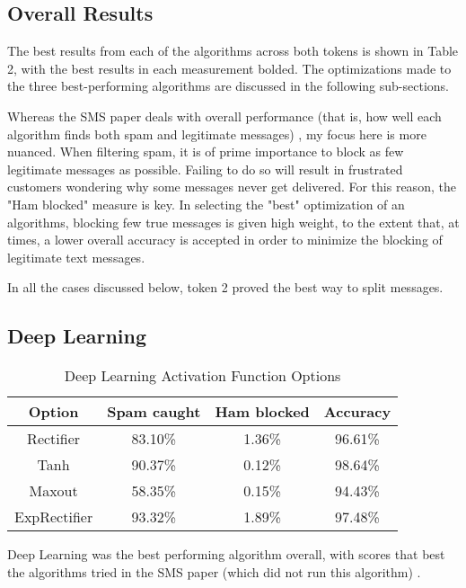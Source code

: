 \documentclass[10pt,journal,compsoc]{IEEEtran}
\begin{document}
\subsection{Overall Results}

The best results from each of the algorithms across both tokens is shown in Table 2, with the best results in each measurement bolded. The optimizations made to the three best-performing algorithms are discussed in the following sub-sections.

Whereas the SMS paper deals with overall performance (that is, how well each algorithm finds both spam and legitimate messages) \cite{Paper}, my focus here is more nuanced. When filtering spam, it is of prime importance to block as few legitimate messages as possible. Failing to do so will result in frustrated customers wondering why some messages never get delivered. For this reason, the "Ham blocked" measure is key. In selecting the "best" optimization of an algorithms, blocking few true messages is given high weight, to the extent that, at times, a lower overall accuracy is accepted in order to minimize the blocking of legitimate text messages.

In all the cases discussed below, token 2 proved the best way to split messages.

\subsection{Deep Learning}

\begin{table}[!t]
\renewcommand{\arraystretch}{1.3}
\caption{Deep Learning Activation Function Options}
\label{Table 3}
\centering
\begin{tabular}{|c|c|c|c|}
\hline
Option & Spam caught & Ham blocked & Accuracy \\ \hline
Rectifier & 83.10\% & 1.36\% & 96.61\% \\ \hline
Tanh & 90.37\% & 0.12\% & 98.64\% \\ \hline
Maxout & 58.35\% & 0.15\% & 94.43\% \\ \hline
ExpRectifier & 93.32\% & 1.89\% & 97.48\% \\ \hline

\end{tabular}
\end{table}

Deep Learning was the best performing algorithm overall, with scores that best the algorithms tried in the SMS paper (which did not run this algorithm) \cite{Paper}.
\end{document}
